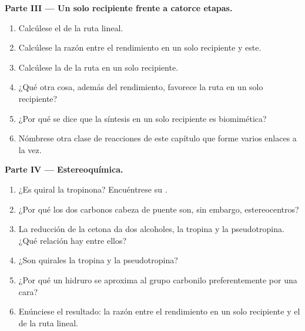 \begin{problem}
\medskip\noindent\textbf{Parte III --- Un solo recipiente frente a catorce etapas.}
\begin{enumerate}[resume]
  \item Calcúlese el  de la ruta lineal.
  \item Calcúlese la razón entre el rendimiento en un solo recipiente y este.
  \item Calcúlese la  de la ruta en un solo recipiente.
  \item ¿Qué otra cosa, además del rendimiento, favorece la ruta en un solo recipiente?
  \item ¿Por qué se dice que la síntesis en un solo recipiente es biomimética?
  \item Nómbrese otra clase de reacciones de este capítulo que forme varios enlaces a la vez.
\end{enumerate}

\medskip\noindent\textbf{Parte IV --- Estereoquímica.}
\begin{enumerate}[resume]
  \item ¿Es quiral la tropinona? Encuéntrese su .
  \item ¿Por qué los dos carbonos cabeza de puente son, sin embargo, estereocentros?
  \item La reducción de la cetona da dos alcoholes, la tropina y la pseudotropina. ¿Qué
        relación hay entre ellos?
  \item ¿Son quirales la tropina y la pseudotropina?
  \item ¿Por qué un hidruro se aproxima al grupo carbonilo preferentemente por una cara?
  \item Enúnciese el resultado: la razón entre el rendimiento en un solo recipiente y el  de la ruta lineal.
\end{enumerate}
\end{problem}
